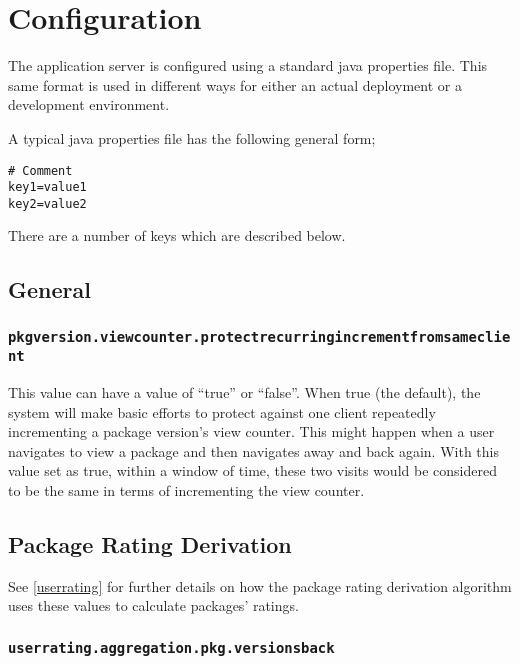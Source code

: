 
\section{Configuration}
\label{config}

The application server is configured using a standard java properties file.  This same format is used in different ways for either an actual deployment or a development environment.

A typical java properties file has the following general form;

\begin{verbatim}
# Comment
key1=value1
key2=value2
\end{verbatim}

There are a number of keys which are described below.

\subsection{General}

\subsubsection{\tt pkgversion.viewcounter.protectrecurringincrementfromsameclient}

This value can have a value of ``true'' or ``false''.  When true (the default), the system will make basic efforts to protect against one client repeatedly incrementing a package version's view counter.  This might happen when a user navigates to view a package and then navigates away and back again.  With this value set as true, within a window of time, these two visits would be considered to be the same in terms of incrementing the view counter.

\subsection{Package Rating Derivation}

See \ref{userrating} for further details on how the package rating derivation algorithm uses these values to calculate packages' ratings.

\subsubsection{\tt userrating.aggregation.pkg.versionsback}

